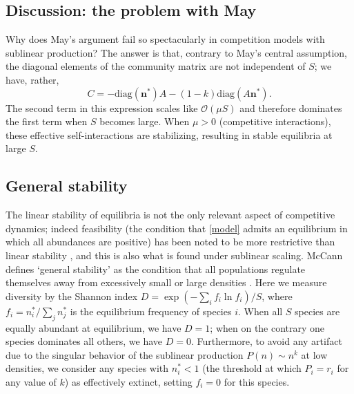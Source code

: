 \documentclass[12pt]{article}
\begin{document}
\subsection{Discussion: the problem with May}

Why does May's argument fail so spectacularly in competition models with sublinear production? The answer is that, contrary to May's central assumption, the diagonal elements of the community matrix are not independent of $S$; we have, rather,
\begin{equation}
    C = - \textrm{diag}(\mathbf{n}^*)A - (1-k)\textrm{diag}(A\mathbf{n}^*).
\end{equation}
The second term in this expression scales like $\mathcal{O}(\mu S)$ and therefore dominates the first term when $S$ becomes large. When $\mu > 0$ (competitive interactions), these effective self-interactions are stabilizing, resulting in stable equilibria at large $S$. 

\subsection{General stability}

The linear stability of equilibria is not the only relevant aspect of competitive dynamics; indeed feasibility (the condition that \eqref{model} admits an equilibrium in which all abundances are positive) has been noted to be more restrictive than linear stability \cite{stone_feasibility_2018}, and this is also what is found under sublinear scaling. McCann defines `general stability' as the condition that all populations regulate themselves away from excessively small or large densities \cite{mccann_diversity_2000}. Here we measure diversity by the Shannon index $D = \exp(-\sum_i f_i \ln f_i)/S$, where $f_i = n_i^*/\sum_{j}n_j^*$ is the equilibrium frequency of species $i$. When all $S$ species are equally abundant at equilibrium, we have $D = 1$; when on the contrary one species dominates all others, we have $D = 0$. Furthermore, to avoid any artifact due to the singular behavior of the sublinear production $P(n) \sim n^k$ at low densities, we consider any species with $n_i^* < 1$ (the threshold at which $P_i = r_i$ for any value of $k$) as effectively extinct, setting $f_i = 0$ for this species. 

\end{document}
